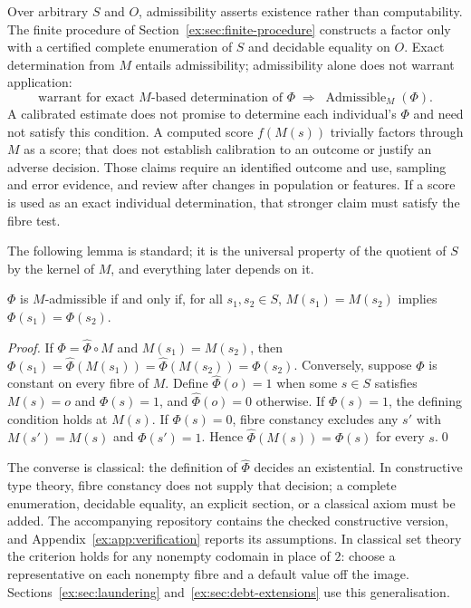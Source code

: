 \documentclass[smallextended,envcountsect,envcountsame,natbib]{svjour3}
\begin{document}
Over arbitrary $S$ and $O$, admissibility asserts existence rather than computability. The finite procedure of Section~\ref{ex:sec:finite-procedure} constructs a factor only with a certified complete enumeration of $S$ and decidable equality on $O$. Exact determination from $M$ entails admissibility; admissibility alone does not warrant application:
\[
\text{warrant for exact $M$-based determination of $\Phi$} \;\Longrightarrow\; \operatorname{Admissible}_M(\Phi).
\]
A calibrated estimate does not promise to determine each individual's $\Phi$ and need not satisfy this condition. A computed score $f(M(s))$ trivially factors through $M$ as a score; that does not establish calibration to an outcome or justify an adverse decision. Those claims require an identified outcome and use, sampling and error evidence, and review after changes in population or features. If a score is used as an exact individual determination, that stronger claim must satisfy the fibre test.

The following lemma is standard; it is the universal property of the quotient of $S$ by the kernel of $M$, and everything later depends on it.

\begin{lemma}\label{ex:prop:fibre}
$\Phi$ is $M$-admissible if and only if, for all $s_1,s_2 \in S$, $M(s_1)=M(s_2)$ implies $\Phi(s_1)=\Phi(s_2)$.
\end{lemma}

\begin{proof}
If $\Phi=\widehat\Phi \circ M$ and $M(s_1)=M(s_2)$, then $\Phi(s_1)=\widehat\Phi(M(s_1))=\widehat\Phi(M(s_2))=\Phi(s_2)$. Conversely, suppose $\Phi$ is constant on every fibre of $M$. Define $\widehat\Phi(o)=1$ when some $s \in S$ satisfies $M(s)=o$ and $\Phi(s)=1$, and $\widehat\Phi(o)=0$ otherwise. If $\Phi(s)=1$, the defining condition holds at $M(s)$. If $\Phi(s)=0$, fibre constancy excludes any $s'$ with $M(s')=M(s)$ and $\Phi(s')=1$. Hence $\widehat\Phi(M(s))=\Phi(s)$ for every $s$.\qed
\end{proof}

\begin{remark}
The converse is classical: the definition of $\widehat\Phi$ decides an existential. In constructive type theory, fibre constancy does not supply that decision; a complete enumeration, decidable equality, an explicit section, or a classical axiom must be added. The accompanying repository contains the checked constructive version, and Appendix~\ref{ex:app:verification} reports its assumptions. In classical set theory the criterion holds for any nonempty codomain in place of $2$: choose a representative on each nonempty fibre and a default value off the image. Sections~\ref{ex:sec:laundering} and~\ref{ex:sec:debt-extensions} use this generalisation.
\end{remark}
\end{document}
